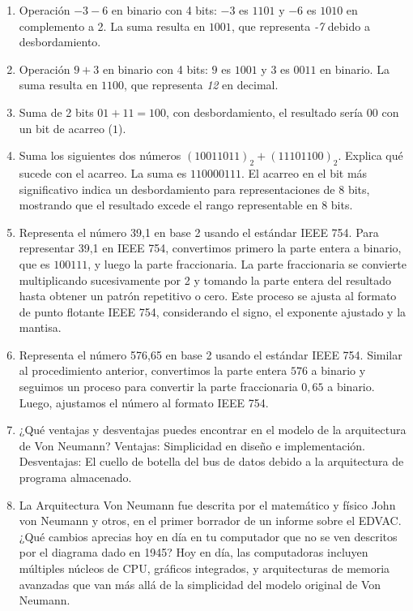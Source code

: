 \documentclass{article}
\begin{document}
\begin{enumerate}
    \item Operación \(-3 - 6\) en binario con 4 bits: \(-3\) es \(1101\) y \(-6\) es \(1010\) en complemento a 2. La suma resulta en \(1001\), que representa \textit{-7} debido a desbordamiento.
    
    \item Operación \(9 + 3\) en binario con 4 bits: \(9\) es \(1001\) y \(3\) es \(0011\) en binario. La suma resulta en \(1100\), que representa \textit{12} en decimal.
    
    \item Suma de 2 bits \(01 + 11 = 100\), con desbordamiento, el resultado sería \(00\) con un bit de acarreo (\(1\)).
    
    \item Suma los siguientes dos números \((10011011)_2 + (11101100)_2\). Explica qué sucede con el acarreo. La suma es \(110000111\). El acarreo en el bit más significativo indica un desbordamiento para representaciones de 8 bits, mostrando que el resultado excede el rango representable en 8 bits.
    
    \item Representa el número 39,1 en base 2 usando el estándar IEEE 754. Para representar 39,1 en IEEE 754, convertimos primero la parte entera a binario, que es \(100111\), y luego la parte fraccionaria. La parte fraccionaria se convierte multiplicando sucesivamente por 2 y tomando la parte entera del resultado hasta obtener un patrón repetitivo o cero. Este proceso se ajusta al formato de punto flotante IEEE 754, considerando el signo, el exponente ajustado y la mantisa.
    
    \item Representa el número 576,65 en base 2 usando el estándar IEEE 754. Similar al procedimiento anterior, convertimos la parte entera \(576\) a binario y seguimos un proceso para convertir la parte fraccionaria \(0,65\) a binario. Luego, ajustamos el número al formato IEEE 754.
    
    \item ¿Qué ventajas y desventajas puedes encontrar en el modelo de la arquitectura de Von Neumann? Ventajas: Simplicidad en diseño e implementación. Desventajas: El cuello de botella del bus de datos debido a la arquitectura de programa almacenado.
    
    \item La Arquitectura Von Neumann fue descrita por el matemático y físico John von Neumann y otros, en el primer borrador de un informe sobre el EDVAC. ¿Qué cambios aprecias hoy en día en tu computador que no se ven descritos por el diagrama dado en 1945? Hoy en día, las computadoras incluyen múltiples núcleos de CPU, gráficos integrados, y arquitecturas de memoria avanzadas que van más allá de la simplicidad del modelo original de Von Neumann.
\end{enumerate}
\end{document}

